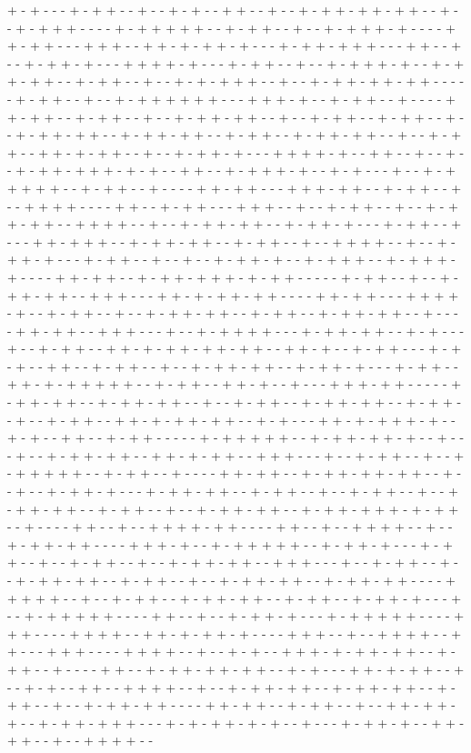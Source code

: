 + - + - - - + - + + - - + - - + - + - - + + - - + - - + - + + - + + - + + - - + - - + - + + + - - - - + - + + + + + - - + - + + - - + - - + - + + + - + - - - - + + - + + - - - + + + - - + + - + - + + - + - - - + - + + - + + + - - - + + - - + - - + - + + - + - - - + + + + - + - - - + - + + - - + - - + - + + + - + - - + - + + - + + - - + - + + - - + - - + - + - + + + - - + - - + - + + - + + - + + - - - - - + - + + - - + - - + - + + + + + + - - - + + + - + - - + - + + - - + - - - - + + - + + - - + - + + - - + - - + - + + - + + - - + - - + - + + - - + - + + - - + - - + - + + - + + - - + - + + - + + - - + - + + - - + - + + - + + - - + - - + - + + - - + + - + - + + - - + - - + - + + - + - - - + + + + - + - - + + - - + - - + - - + - + + - + + + - + - + - - + + - - + - + + + - + - - + - + - - - + - - + - + + + + + - - + - + + - - + - - - - + + - + + - - - + + + - + + - - + - + + - - + - - + + + + - - - - + + - - + - + + - - - + + + - - + - - + - + + - - + - - + - + + - + + - - + + + + - - + - - + - + + - + + - - + - + + - + - - - + - + + - - + - - - + + - + + + - - + - + + - + + - - + - + + - - + - - + + + + - - + - - + - + + - + - - - + - + + - - + - - + - - + - + + - + - - + - + + + - - + - + + + - + - - - - + + - + + - - + - + + - + + + - + - + + - - - - - + - + + - - + - - + - + + - + + - - + + + - - - + + - + - + + - + + - - - - + + - + + - - - + + + + - + - - + - + + - - + - - + - + + - + + - - + - + + - - + - + + - + + - - + - - - - + + - + + - - + + + - - - + - - + - + + + + - - - + - + + - + + - - + - + - - - + - - + - + + - - + + - + - + + - + + - + + - - + + - + - - + - + + - - - + - + - + - - + + - - + - + + - - + - - + - + + - + + - - + - + + - + - - - + - + + - - + + - + - + + + + + - - + - + + - - + + - + - - + - - - + + + - + + - - - - - + - + + - + + - - + - + + - + + - - + - - + - + + - - + - + + - + + - - + - + + - - + - - + - + + - - + + - + - + + - + + - - + - + - - - + + - + - + + + - + - - + - + - - + + - - + - + + - - - - - + - + + + + + - - + - + + - + + - + - - + - - - + - - + - + + - + + - - + + - + - + + - - + + + - - - + - - + - + + - - + - - + - + + + + + - - + - + + - - + - - - - + + - + + - - + - + + - + + - + + - - + - - + - - + - + + - + - - - + - + + - + + - - + - + + - - + - - + - + + - - + - - + - + + - + + - - + - + + - - + - - + - + + - + + - - + - + + - + + + - + - + + - - + - - - - + + - - + - - + + + + - + + - - - - + + - - + - - + + + + - - + - - + - + + - + + - - - - + + + - + - - + - + + + + + - - + - + + - + - - - + - + + - - + - - + - + + - - + - - + - + + - + + - - + + + - - - + - - + - + + - - + - - + - + + - + + - - + - + + - - + - - + - + + - + + - - + - + + - + + - - - - + + + + + - - + - - + - + + - - + - + + - + + - - + - + + - - + - + + - + - - - + - - + - + + + + + - - - - + + - - + - - + - + + - + - - - + - + + + + + - - - - + + + - - - - + + + + - - + + - + - + + - + - - - - + + + - - + - - + + + + - - + + - - - + + + - - - - + + + + - - + - - + - + - - + + + - + - + + - + + - - + - + + - - + - - - - + + - - + - + + - + + - + + - - + - + - - - + + - + - + + - - + - - + - + - - + + - - + + + + - - + - - + - + + - + + - - + - + + - + + - - + - + + - - + - - + - + + - + + - - - - + + - + + - - + - + + - - + - - + + - + + - + - - + - + + - + + + - - - + - + - + + - + - + - - + - - - + - + + - + - - + + - + + - - + - - + + + + - - 
